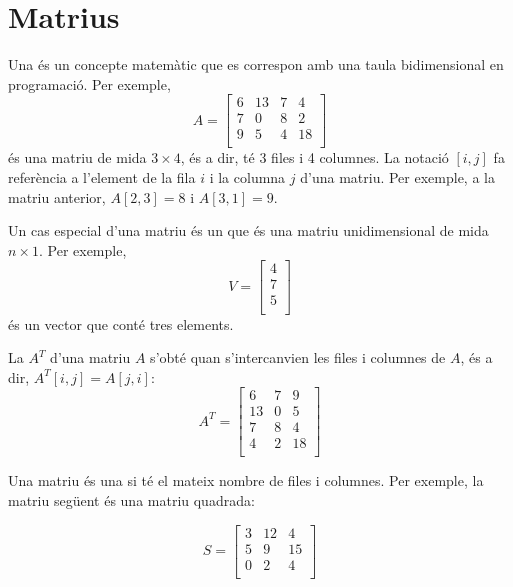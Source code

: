 \chapter{Matrius}


Una  és un concepte matemàtic que es correspon amb una taula
bidimensional en programació. Per exemple,
\[
A = 
 \begin{bmatrix}
  6 & 13 & 7 & 4 \\
  7 & 0 & 8 & 2 \\
  9 & 5 & 4 & 18 \\
 \end{bmatrix}
\]
és una matriu de mida $3 \times 4$, és a dir, té 3 files i 4
columnes. La notació $[i,j]$ fa referència a l'element de la fila $i$
i la columna $j$ d'una matriu. Per exemple, a la matriu anterior,
$A[2,3]=8$ i $A[3,1]=9$.


Un cas especial d'una matriu és un  que és una matriu
unidimensional de mida $n \times 1$. Per exemple,
\[
V =
\begin{bmatrix}
4 \\
7 \\
5 \\
\end{bmatrix}
\]
és un vector que conté tres elements.


La  $A^T$ d'una matriu $A$ s'obté quan s'intercanvien
les files i columnes de $A$, és a dir, $A^T[i,j]=A[j,i]$:
\[
A^T = 
 \begin{bmatrix}
  6 & 7 & 9 \\
  13 & 0 & 5 \\
  7 & 8 & 4 \\
  4 & 2 & 18 \\
 \end{bmatrix}
\]



Una matriu és una  si té el mateix nombre de
files i columnes. Per exemple, la matriu següent és una matriu
quadrada:


\[
S = 
 \begin{bmatrix}
  3 & 12 & 4  \\
  5 & 9 & 15  \\
  0 & 2 & 4 \\
 \end{bmatrix}
\]


